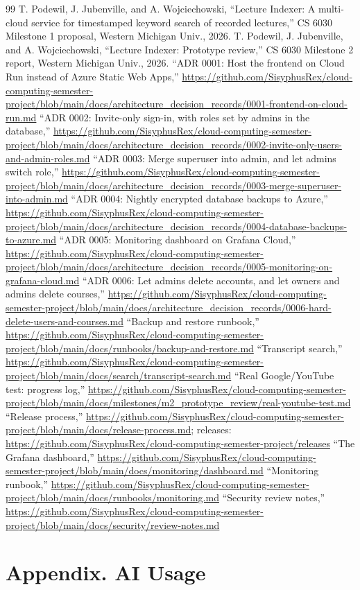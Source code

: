 \documentclass[conference]{IEEEtran}
\newcommand{\repo}{https://github.com/SisyphusRex/cloud-computing-semester-project}
\begin{document}
\begin{thebibliography}{99}
 T. Podewil, J. Jubenville, and A. Wojciechowski, ``Lecture Indexer: A multi-cloud service for timestamped keyword search of recorded lectures,'' CS 6030 Milestone 1 proposal, Western Michigan Univ., 2026.
 T. Podewil, J. Jubenville, and A. Wojciechowski, ``Lecture Indexer: Prototype review,'' CS 6030 Milestone 2 report, Western Michigan Univ., 2026.
 ``ADR 0001: Host the frontend on Cloud Run instead of Azure Static Web Apps,'' \url{\repo/blob/main/docs/architecture_decision_records/0001-frontend-on-cloud-run.md}
 ``ADR 0002: Invite-only sign-in, with roles set by admins in the database,'' \url{\repo/blob/main/docs/architecture_decision_records/0002-invite-only-users-and-admin-roles.md}
 ``ADR 0003: Merge superuser into admin, and let admins switch role,'' \url{\repo/blob/main/docs/architecture_decision_records/0003-merge-superuser-into-admin.md}
 ``ADR 0004: Nightly encrypted database backups to Azure,'' \url{\repo/blob/main/docs/architecture_decision_records/0004-database-backups-to-azure.md}
 ``ADR 0005: Monitoring dashboard on Grafana Cloud,'' \url{\repo/blob/main/docs/architecture_decision_records/0005-monitoring-on-grafana-cloud.md}
 ``ADR 0006: Let admins delete accounts, and let owners and admins delete courses,'' \url{\repo/blob/main/docs/architecture_decision_records/0006-hard-delete-users-and-courses.md}
 ``Backup and restore runbook,'' \url{\repo/blob/main/docs/runbooks/backup-and-restore.md}
 ``Transcript search,'' \url{\repo/blob/main/docs/search/transcript-search.md}
 ``Real Google/YouTube test: progress log,'' \url{\repo/blob/main/docs/milestones/m2_prototype_review/real-youtube-test.md}
 ``Release process,'' \url{\repo/blob/main/docs/release-process.md}; releases: \url{\repo/releases}
 ``The Grafana dashboard,'' \url{\repo/blob/main/docs/monitoring/dashboard.md}
 ``Monitoring runbook,'' \url{\repo/blob/main/docs/runbooks/monitoring.md}
 ``Security review notes,'' \url{\repo/blob/main/docs/security/review-notes.md}
\end{thebibliography}

\onecolumn
\section*{\centering Appendix. AI Usage}
\end{document}
